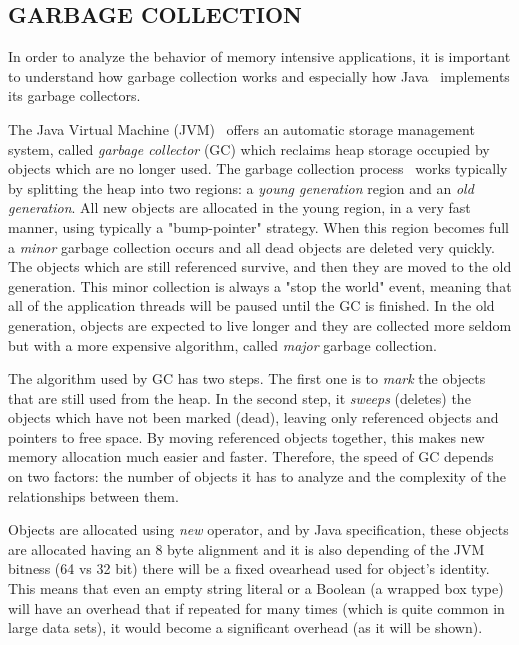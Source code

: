 \documentclass[a4paper,twoside]{article}
\begin{document}
\subsection{\uppercase{Garbage Collection}}
\label{background:gc}

In order to analyze the behavior of memory intensive applications, it is important to understand how garbage collection
works and especially how Java~\cite{java} implements its garbage collectors.

The Java Virtual Machine (JVM)~\cite{lindholm:2014} offers an automatic storage management system,
called {\textit{garbage collector} (GC)} which reclaims heap storage occupied by objects which are no longer used.
The garbage collection process~\cite{gc:oracle} works typically by splitting the heap into two regions:
a {\textit{young generation}} region and an {\textit{old generation}}.
All new objects are allocated in the young region, in a very fast manner, using typically a "bump-pointer" strategy.
When this region becomes full  a {\textit{minor}} garbage collection occurs and all dead objects are deleted very quickly.
The objects which are still referenced survive, and then they are moved to the old generation.
This minor collection is always a "stop the world" event, meaning that all of the application threads will be paused
until the GC is finished.
In the old generation, objects are expected to live longer and they are collected more seldom but with a more expensive
algorithm, called {\textit{major}} garbage collection.

The algorithm used by GC has two steps.
The first one is to {\textit{mark}} the objects that are still used from the heap.
In the second step, it {\textit{sweeps}  (deletes)} the objects which have not been marked (dead), leaving only
referenced objects and pointers to free space.
By moving referenced objects together, this makes new memory allocation much easier and faster.
Therefore, the speed of GC depends on two factors: the number of objects it has to analyze and the complexity of the
relationships between them.

Objects are allocated using {\textit{new}} operator, and by Java specification, these objects are allocated having an
8 byte alignment and it is also depending of the JVM bitness (64 vs 32 bit) there will be a fixed ovearhead used for
object's identity. This means that even an empty string literal or a Boolean (a wrapped box type) will have an overhead
that if repeated for many times (which is quite common in large data sets), it would become a significant overhead (as it will be shown).
\end{document}

